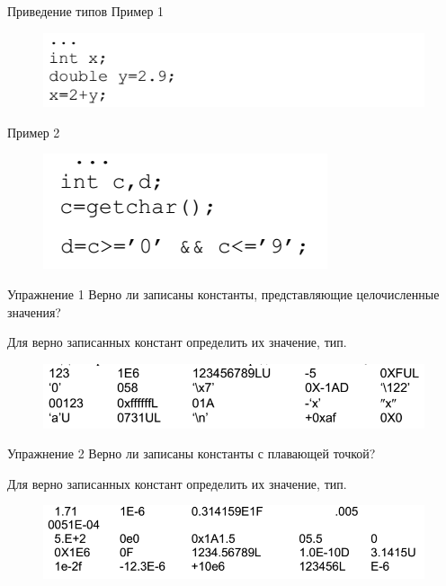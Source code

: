 \documentclass{beamer}
\begin{document}
\begin{frame}{Приведение типов}
Пример 1
\begin{figure}[h]
\centering
\includegraphics[scale=0.5]{images/lec02-pic05.png}
\end{figure}
Пример 2
\begin{figure}[h]
\centering
\includegraphics[scale=0.5]{images/lec02-pic06.png}
\end{figure}
\end{frame}

\begin{frame}{Упражнение 1}
Верно ли записаны константы, представляющие целочисленные значения? 

Для верно записанных констант определить их значение, тип.
\begin{figure}[h]
\centering
\includegraphics[scale=0.5]{images/lec02-pic06-01.png}
\end{figure}
\end{frame}

\begin{frame}{Упражнение 2}
Верно ли записаны константы с плавающей точкой? 

Для верно записанных констант определить их значение, тип.
\begin{figure}[h]
\centering
\includegraphics[scale=0.5]{images/lec02-pic06-02.png}
\end{figure}
\end{frame}
\end{document}
